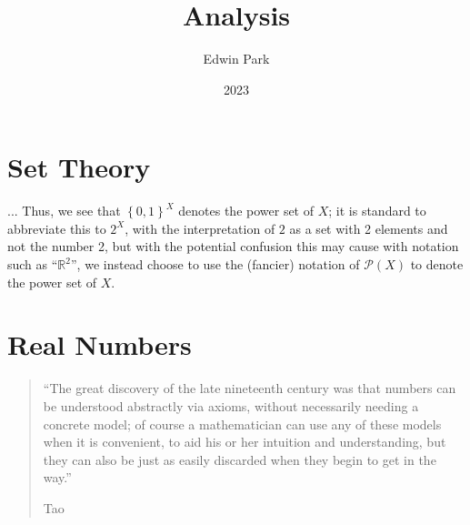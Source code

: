 \documentclass{article}
\title{Analysis}
\author{Edwin Park}
\date{2023}
\theoremstyle{definition}
\begin{document}
\clearpage\maketitle\thispagestyle{empty} %
\newpage
\tableofcontents
\newpage\setcounter{page}{1}

\section{Set Theory}
... Thus, we see that $\left\{0,1\right\}^X$ denotes the power set of $X$; it is standard to abbreviate this to $2^X$, with the interpretation of $2$ as a set with 2 elements and not the number 2, but with the potential confusion this may cause with notation such as ``$\mathbb{R}^2$'',
we instead choose to use the (fancier) notation of $\mathscr{P}(X)$ to denote the power set of $X$.
\section{Real Numbers}
\begin{quotation}
	``The great discovery of the late nineteenth century was that numbers can be understood abstractly via axioms, without necessarily needing a concrete model; of course a mathematician can use any of these models when it is convenient, to aid his or her intuition and understanding, but they can also be just as easily discarded when they begin to get in the way.''
	\begin{flushright}
		Tao \cite[19]{taoanal1}
	\end{flushright}
\end{quotation}
\end{document}
